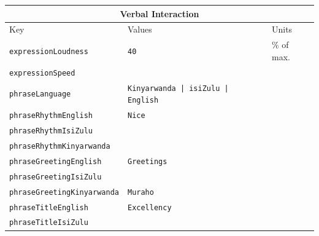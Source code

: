 \documentclass{CSSRforAfrica}
\begin{document}
 
\begin{table}[H]
\begin{center}
\begin{tabular}{|l l l|}
\hline \hline
\multicolumn{3}{|c|}{{\small \bf Verbal Interaction}} \\
\hline \hline
 {\small  Key  }                                         &  {\small Values }   &  {\small Units }       \\
\hline
{\footnotesize \verb+expressionLoudness+} 	           & {\footnotesize \verb+40+ } \vspace{-1mm} & {\footnotesize  \% of max.  } \\
{\footnotesize \verb+expressionSpeed+} 	           & {\footnotesize \verb++}  \vspace{-1mm} & {\footnotesize  } \\
{\footnotesize \verb+phraseLanguage+}     & {\footnotesize \verb+Kinyarwanda | isiZulu | English+} \vspace{-1mm} & {\footnotesize  } \\
{\footnotesize \verb+phraseRhythmEnglish+}     & {\footnotesize \verb+Nice+}\vspace{-1mm} & {\footnotesize  } \\
{\footnotesize \verb+phraseRhythmIsiZulu+}     & {\footnotesize \verb++}\vspace{-1mm} & {\footnotesize  } \\
{\footnotesize \verb+phraseRhythmKinyarwanda+}     & {\footnotesize \verb++}\vspace{-1mm} & {\footnotesize  } \\
{\footnotesize \verb+phraseGreetingEnglish+}     & {\footnotesize \verb+Greetings+}\vspace{-1mm} & {\footnotesize  } \\
{\footnotesize \verb+phraseGreetingIsiZulu+}     & {\footnotesize \verb++}\vspace{-1mm} & {\footnotesize  } \\
{\footnotesize \verb+phraseGreetingKinyarwanda+}     & {\footnotesize \verb+Muraho+}\vspace{-1mm} & {\footnotesize  } \\
{\footnotesize \verb+phraseTitleEnglish+}     & {\footnotesize \verb+Excellency+}\vspace{-1mm} & {\footnotesize  } \\
{\footnotesize \verb+phraseTitleIsiZulu+}     & {\footnotesize \verb++}\vspace{-1mm} & {\footnotesize  } \\

\end{tabular}
\end{center}
\end{table}
\end{document}
